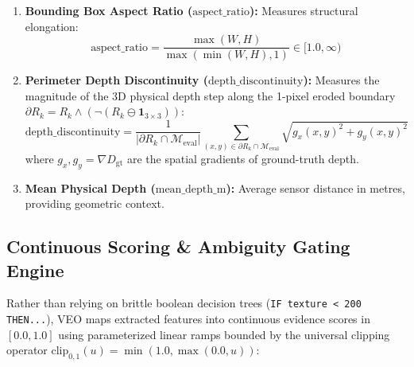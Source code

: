\documentclass[11pt,a4paper]{article}
\begin{document}
\begin{enumerate}
    \item \textbf{Bounding Box Aspect Ratio ($\text{aspect\_ratio}$):} Measures structural elongation:
    \begin{equation}
    \label{eq:feat_aspect}
    \text{aspect\_ratio} = \frac{\max(W, H)}{\max(\min(W, H), 1)} \in [1.0, \infty)
    \end{equation}
    \item \textbf{Perimeter Depth Discontinuity ($\text{depth\_discontinuity}$):} Measures the magnitude of the 3D physical depth step along the 1-pixel eroded boundary $\partial R_k = R_k \land (\neg (R_k \ominus \mathbf{1}_{3\times 3}))$:
    \begin{equation}
    \label{eq:feat_discontinuity}
    \text{depth\_discontinuity} = \frac{1}{|\partial R_k \cap \mathcal{M}_{\mathrm{eval}}|} \sum_{(x,y) \in \partial R_k \cap \mathcal{M}_{\mathrm{eval}}} \sqrt{g_x(x,y)^2 + g_y(x,y)^2}
    \end{equation}
    where $g_x, g_y = \nabla D_{\mathrm{gt}}$ are the spatial gradients of ground-truth depth.
    \item \textbf{Mean Physical Depth ($\text{mean\_depth\_m}$):} Average sensor distance in metres, providing geometric context.
\end{enumerate}

\subsection{Continuous Scoring & Ambiguity Gating Engine}
\label{sec:scoring}
Rather than relying on brittle boolean decision trees (\texttt{IF texture < 200 THEN...}), VEO maps extracted features into continuous evidence scores in $[0.0, 1.0]$ using parameterized linear ramps bounded by the universal clipping operator $\text{clip}_{0,1}(u) = \min(1.0, \max(0.0, u))$:
\end{document}
